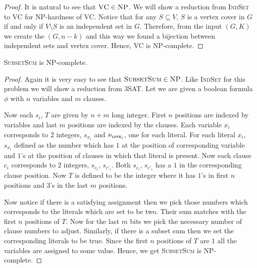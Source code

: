 \begin{proof}
It is natural to see that $\textsc{VC}\in\textsc{NP}$. We will show a reduction from \textsc{IndSet} to \textsc{VC} for \textsc{NP}-hardness of \textsc{VC}. Notice that for any $S\subseteq V$, $S$ is a vertex cover in $G$ if and only if $V\setminus S$ is an independent set in $G$. Therefore, from the input $(G,K)$ we create the $(G,n-k)$ and this way we found a bijection between independent sets and vertex cover. Hence, \textsc{VC} is \textsc{NP}-complete.
\end{proof}
\begin{Theorem}{}{}
\textsc{SubsetSum} is \textsc{NP}-complete. 
\end{Theorem}
\begin{proof}
Again it is very easy to see that $\textsc{SubsetSum}\in\textsc{NP}$. Like \textsc{IndSet} for this problem we will show a reduction from \textsc{3SAT}. Let we are given a boolean formula $\phi$ with $n$ variables and $m$ clauses.

Now each $s_i$, $T$ are given by $n+m$ long integer. First $n$ positions are indexed by variables and last $m$ positions are indexed by the clauses. Each variable $x_i$ corresponds to $2$ integers, $s_{x_i}$ and $s_{\ovx_i}$, one for each literal. For each literal $x_i$,  $s_{x_i}$ defined as the number which has $1$ at the position of corresponding variable and $1$'s at the position of clauses in which that literal is present. Now each clause $c_i$ corresponds to $2$ integers, $s_{c_i}$, $s_{c'_i}$. Both $s_{c_i}$, $s_{c'_i}$ has a $1$ in the corresponding clause position. Now $T$ is defined to be the integer where it has $1$'s in first $n$ positions and $3$'s in the last $m$ positions.

Now notice if there is a satisfying assignment then we pick those numbers which corresponds to the literals which are set to be two. Their sum matches with the first $n$ positions of $T$. Now for the last $m$ bits we pick the necessary number of clause numbers to adjust. Similarly, if there is a subset sum then we set the corresponding literals to be true. Since the first $n$ positions of $T$ are $1$ all the variables are assigned to some value. Hence, we get \textsc{SubsetSum} is \textsc{NP}-complete. 
\end{proof}